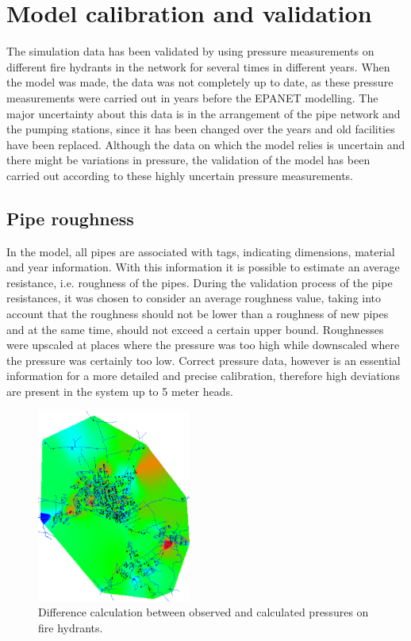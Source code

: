 \section{Model calibration and validation}
\label{model_calibration_and_validation}

The simulation data has been validated by using pressure measurements on different fire hydrants in the network for several times in different years. When the model was made, the data was not completely up to date, as these pressure measurements were carried out in years before the EPANET modelling. The major uncertainty about this data is in the arrangement of the pipe network and the pumping stations, since it has been changed over the years and old facilities have been replaced. Although the data on which the model relies is uncertain and there might be variations in pressure, the validation of the model has been carried out according to these highly uncertain pressure measurements. 

\subsection{Pipe roughness}
\label{pipe_roughness}

In the model, all pipes are associated with tags, indicating dimensions, material and year information. With this information it is possible to estimate an average resistance, i.e. roughness of the pipes. 
During the validation process of the pipe resistances, it was chosen to consider an average roughness value, taking into account that the roughness should not be lower than a roughness of new pipes and at the same time, should not exceed a certain upper bound. Roughnesses were upscaled at places where the pressure was too high while downscaled where the pressure was certainly too low. Correct pressure data, however is an essential information for a more detailed and precise calibration, therefore high deviations are present in the system up to 5 meter heads. 

\begin{figure}[H]
\centering
\includegraphics[width=0.45\textwidth]{report/pictures/fire_hydrants}
% 
\caption{Difference calculation between observed and calculated pressures on fire hydrants\cite{verdo_doc}.}
\label{fig:PRV_EPANET}
\end{figure}

